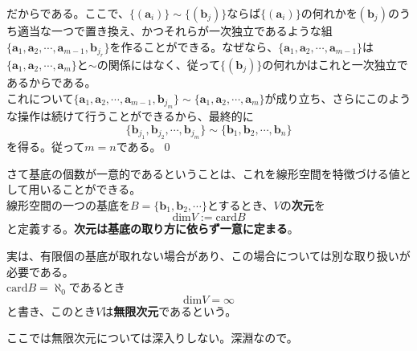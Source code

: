 \documentclass[dvipdfmx]{jsarticle}
\begin{document}
だからである。ここで、$\{(\bm{a}_i)\}\sim\{(\bm{b}_j)\}$ならば$\{(\bm{a}_i)\}$の何れかを$(\bm{b}_j)$のうち適当な一つで置き換え、かつそれらが一次独立であるような組$\{\bm{a}_1,\bm{a}_2,\cdots,\bm{a}_{m-1},\bm{b}_{j_r}\}$を作ることができる。なぜなら、$\{\bm{a}_1,\bm{a}_2,\cdots,\bm{a}_{m-1}\}$は$\{\bm{a}_1,\bm{a}_2,\cdots,\bm{a}_m\}$と$\sim$の関係にはなく、従って$\{(\bm{b}_j)\}$の何れかはこれと一次独立であるからである。\\
これについて$\{\bm{a}_1,\bm{a}_2,\cdots,\bm{a}_{m-1},\bm{b}_{j_m}\}\sim\{\bm{a}_1,\bm{a}_2,\cdots,\bm{a}_m\}$が成り立ち、さらにこのような操作は続けて行うことができるから、最終的に
\[\{\bm{b}_{j_1},\bm{b}_{j_2},\cdots,\bm{b}_{j_m}\}\sim\{\bm{b}_1,\bm{b}_2,\cdots,\bm{b}_n\}\]
を得る。従って$m=n$である。\qed\\\par
さて基底の個数が一意的であるということは、これを線形空間を特徴づける値として用いることができる。\\
線形空間の一つの基底を$B=\{\bm{b}_1,\bm{b}_2,\cdots\}$とするとき、$V$の\textbf{次元}を
\[\mathrm{dim}V:=\mathrm{card}B\]
と定義する。\textbf{次元は基底の取り方に依らず一意に定まる}。\\\par
実は、有限個の基底が取れない場合があり、この場合については別な取り扱いが必要である。\\
$\mathrm{card}B=\aleph_0$であるとき
\[\mathrm{dim}V=\infty\]
と書き、このとき$V$は\textbf{無限次元}であるという。	\\\par
ここでは無限次元については深入りしない。深淵なので。
\end{document}
